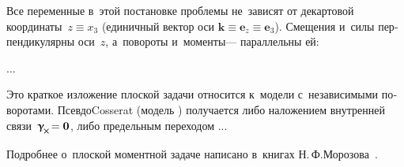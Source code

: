 

\label{section:planedeformation.cosseratcontinuum}

\begin{otherlanguage}{russian}

Все переменные в~этой постановке проблемы не~зависят от декартовой координаты~${z \equiv x_3}$
(единичный вектор оси ${\bm{k} \equiv \bm{e}_z \equiv \bm{e}_3}$).
Смещения и~силы перпендикулярны оси~$z$, а~повороты и~моменты\:--- параллельны ей:

...


Это краткое изложение плоской задачи относится к~модели с~независимыми поворотами.
Псевдо\rucontinuum Cosserat (модель ) получается
либо наложением внутренней связи~${\distortiontensor_{\hspace{-0.25ex}\Xcompanion} \hspace{-0.32ex} = \zerovector}$,
либо предельным переходом ...

Подробнее о~плоской моментной задаче написано в~книгах Н.\,Ф.\;Морозова~\cite{morozov-twodimensionalproblems, morozov-fractures}.

\end{otherlanguage}



\label{section:nonlinear.micropolar}

